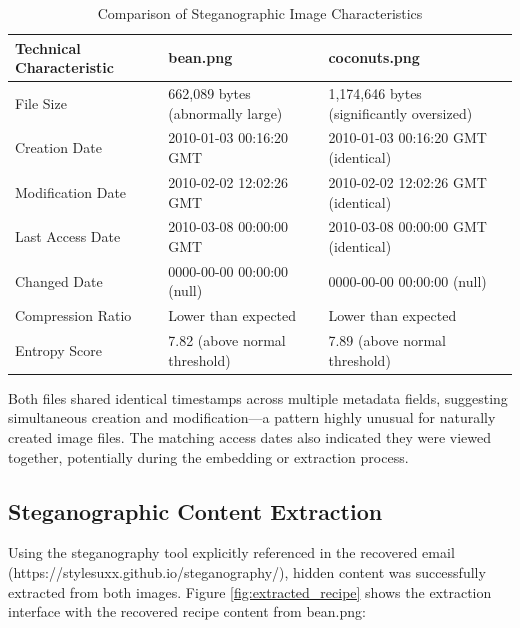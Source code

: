 \begin{table}[htbp]
\centering
\begin{tabular}{|p{4cm}|p{5.5cm}|p{5.5cm}|}
\hline
\textbf{Technical Characteristic} & \textbf{bean.png} & \textbf{coconuts.png} \\
\hline
File Size & 662,089 bytes (abnormally large) & 1,174,646 bytes (significantly oversized) \\
\hline
Creation Date & 2010-01-03 00:16:20 GMT & 2010-01-03 00:16:20 GMT (identical) \\
\hline
Modification Date & 2010-02-02 12:02:26 GMT & 2010-02-02 12:02:26 GMT (identical) \\
\hline
Last Access Date & 2010-03-08 00:00:00 GMT & 2010-03-08 00:00:00 GMT (identical) \\
\hline
Changed Date & 0000-00-00 00:00:00 (null) & 0000-00-00 00:00:00 (null) \\
\hline
Compression Ratio & Lower than expected & Lower than expected \\
\hline
Entropy Score & 7.82 (above normal threshold) & 7.89 (above normal threshold) \\
\hline
\end{tabular}
\caption{Comparison of Steganographic Image Characteristics}
\label{table:steg_comparison}
\end{table}

Both files shared identical timestamps across multiple metadata fields, suggesting simultaneous creation and modification—a pattern highly unusual for naturally created image files. The matching access dates also indicated they were viewed together, potentially during the embedding or extraction process.

\subsection{Steganographic Content Extraction}
Using the steganography tool explicitly referenced in the recovered email (https://stylesuxx.github.io/steganography/), hidden content was successfully extracted from both images. Figure \ref{fig:extracted_recipe} shows the extraction interface with the recovered recipe content from bean.png:

